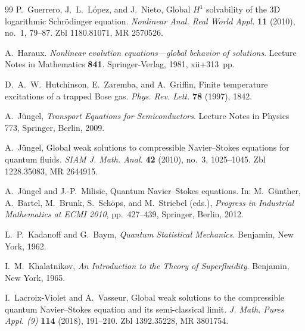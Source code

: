 \documentclass[11pt]{article}
\begin{document}
\begin{thebibliography}{99}
P.~Guerrero, J.~L.~L\'opez, and J.~Nieto,
\newblock Global \(H^1\) solvability of the 3D logarithmic Schr\"odinger equation.
\newblock \emph{Nonlinear Anal. Real World Appl.} \textbf{11} (2010), no.~1, 79--87.
\newblock Zbl 1180.81071, MR 2570526.



A.~Haraux.
\newblock \emph{Nonlinear evolution equations—global behavior of solutions}.
\newblock Lecture Notes in Mathematics \textbf{841}. Springer‐Verlag, 1981,
  xii+313~pp.
  
  

D.~A.~W.~Hutchinson, E.~Zaremba, and A.~Griffin,
\newblock Finite temperature excitations of a trapped Bose gas.
\newblock \emph{Phys. Rev. Lett.} \textbf{78} (1997), 1842.

A.~J\"ungel,
\newblock \emph{Transport Equations for Semiconductors}.
\newblock Lecture Notes in Physics 773, Springer, Berlin, 2009.

A.~J\"ungel,
\newblock Global weak solutions to compressible Navier--Stokes equations for quantum fluids.
\newblock \emph{SIAM J. Math. Anal.} \textbf{42} (2010), no.~3, 1025--1045.
\newblock Zbl 1228.35083, MR 2644915.

A.~J\"ungel and J.-P.~Milisic,
\newblock Quantum Navier--Stokes equations.
\newblock In: M.~G\"unther, A.~Bartel, M.~Brunk, S.~Sch\"ops, and M.~Striebel (eds.),
\newblock \emph{Progress in Industrial Mathematics at ECMI 2010}, pp.~427--439, Springer, Berlin, 2012.

L.~P.~Kadanoff and G.~Baym,
\newblock \emph{Quantum Statistical Mechanics}.
\newblock Benjamin, New York, 1962.

I.~M.~Khalatnikov,
\newblock \emph{An Introduction to the Theory of Superfluidity}.
\newblock Benjamin, New York, 1965.

I.~Lacroix-Violet and A.~Vasseur,
\newblock Global weak solutions to the compressible quantum Navier--Stokes equation and its semi-classical limit.
\newblock \emph{J. Math. Pures Appl. (9)} \textbf{114} (2018), 191--210.
\newblock Zbl 1392.35228, MR 3801754.


\end{thebibliography}
\end{document}
